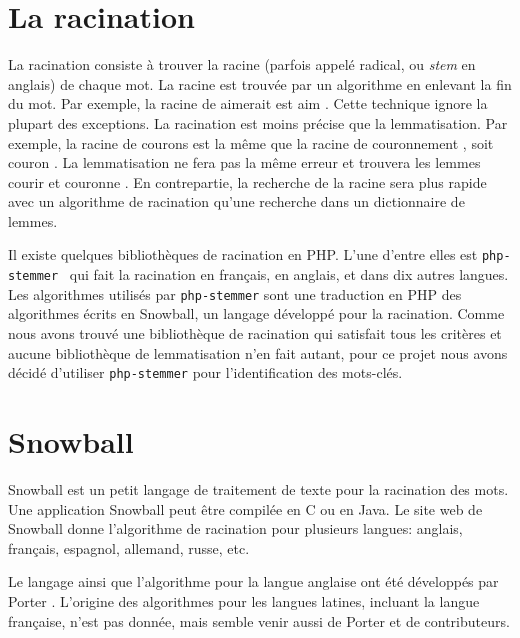 \section{La racination}
La racination consiste \`a trouver la racine (parfois appel\'e radical, ou \emph{stem} en anglais) de chaque mot.
La racine est trouv\'ee par un algorithme en enlevant la fin du mot.
Par exemple, la racine de \og aimerait \fg{} est \og aim \fg{}.
Cette technique ignore la plupart des exceptions.
La racination est moins pr\'ecise que la lemmatisation.
Par exemple, la racine de \og courons \fg{} est la m\^eme que la racine de \og couronnement \fg{}, soit \og couron \fg{}.
La lemmatisation ne fera pas la m\^eme erreur et trouvera les lemmes \og courir \fg{} et \og couronne \fg{}.
En contrepartie, la recherche de la racine sera plus rapide avec un algorithme de racination qu'une recherche dans un dictionnaire de lemmes.

Il existe quelques biblioth\`eques de racination en PHP.
L'une d'entre elles est \texttt{php-stemmer}~\cite{phpstemmer} qui fait la racination en fran\c{c}ais, en anglais, et dans dix autres langues.
Les algorithmes utilis\'es par \texttt{php-stemmer} sont une traduction en PHP des algorithmes \'ecrits en Snowball, un langage d\'evelopp\'e pour la racination.
%
Comme nous avons trouv\'e une biblioth\`eque de racination qui satisfait tous les crit\`eres et aucune biblioth\`eque de lemmatisation n'en fait autant, pour ce projet nous avons d\'ecid\'e d'utiliser \texttt{php-stemmer} pour l'identification des mots-cl\'es.

\section{Snowball}
Snowball est un petit langage de traitement de texte pour la racination des mots.
Une application Snowball peut \^etre compil\'ee en C ou en Java.
Le site web de Snowball donne l'algorithme de racination pour plusieurs langues: anglais, fran\c{c}ais, espagnol, allemand, russe, etc.

Le langage ainsi que l'algorithme pour la langue anglaise ont \'et\'e d\'evelopp\'es par Porter \cite{snowball}.
%
L'origine des algorithmes pour les langues latines, incluant la langue fran\c{c}aise, n'est pas donn\'ee, mais semble venir aussi de Porter et de contributeurs.

